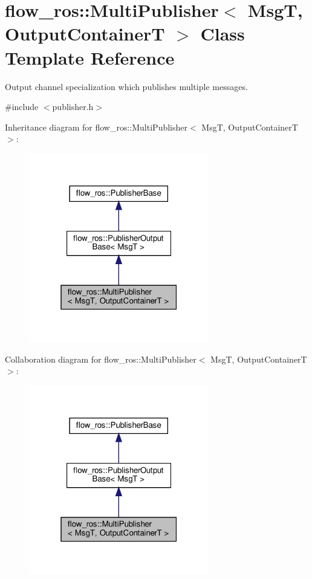 \hypertarget{classflow__ros_1_1_multi_publisher}{}\section{flow\+\_\+ros\+:\+:Multi\+Publisher$<$ MsgT, Output\+ContainerT $>$ Class Template Reference}
\label{classflow__ros_1_1_multi_publisher}


Output channel specialization which publishes multiple messages.  




{\ttfamily \#include $<$publisher.\+h$>$}



Inheritance diagram for flow\+\_\+ros\+:\+:Multi\+Publisher$<$ MsgT, Output\+ContainerT $>$\+:\nopagebreak
\begin{figure}[H]
\begin{center}
\leavevmode
\includegraphics[width=223pt]{classflow__ros_1_1_multi_publisher__inherit__graph}
\end{center}
\end{figure}


Collaboration diagram for flow\+\_\+ros\+:\+:Multi\+Publisher$<$ MsgT, Output\+ContainerT $>$\+:\nopagebreak
\begin{figure}[H]
\begin{center}
\leavevmode
\includegraphics[width=223pt]{classflow__ros_1_1_multi_publisher__coll__graph}
\end{center}
\end{figure}
